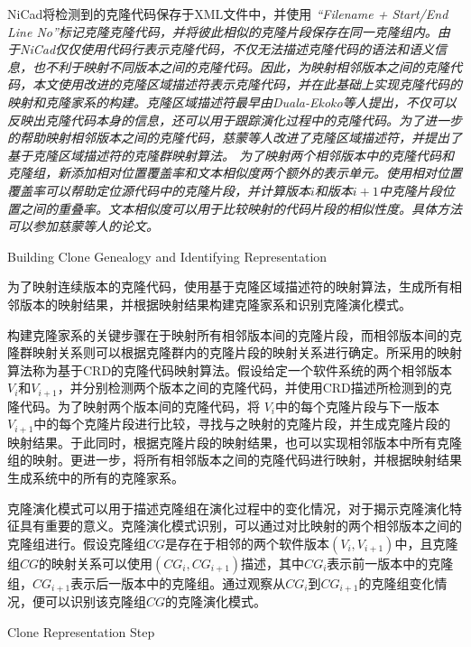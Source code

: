NiCad将检测到的克隆代码保存于XML文件中，并使用\em{ ``Filename + Start/End Line No''}标记克隆克隆代码，并将彼此相似的克隆片段保存在同一克隆组内。由于NiCad仅仅使用代码行表示克隆代码，不仅无法描述克隆代码的语法和语义信息，也不利于映射不同版本之间的克隆代码。因此，为映射相邻版本之间的克隆代码，本文使用改进的克隆区域描述符表示克隆代码，并在此基础上实现克隆代码的映射和克隆家系的构建。克隆区域描述符最早由Duala-Ekoko等人提出，不仅可以反映出克隆代码本身的信息，还可以用于跟踪演化过程中的克隆代码\cite{duala2010clone}。为了进一步的帮助映射相邻版本之间的克隆代码，慈蒙等人改进了克隆区域描述符，并提出了基于克隆区域描述符的克隆群映射算法\cite{ci2013new}\cite{ci2013newD}。
为了映射两个相邻版本中的克隆代码和克隆组，新添加相对位置覆盖率和文本相似度两个额外的表示单元。使用相对位置覆盖率可以帮助定位源代码中的克隆片段，并计算版本$ i $和版本$ i + 1 $中克隆片段位置之间的重叠率。文本相似度可以用于比较映射的代码片段的相似性度。具体方法可以参加慈蒙等人的论文\cite{ci2013newD}。

{Building Clone Genealogy and Identifying Representation}

为了映射连续版本的克隆代码，使用基于克隆区域描述符的映射算法，生成所有相邻版本的映射结果，并根据映射结果构建克隆家系和识别克隆演化模式。

构建克隆家系的关键步骤在于映射所有相邻版本间的克隆片段，而相邻版本间的克隆群映射关系则可以根据克隆群内的克隆片段的映射关系进行确定。所采用的映射算法称为基于CRD的克隆代码映射算法\cite{ci2013new}\cite{ci2013newD}。假设给定一个软件系统的两个相邻版本{$V_i$}和{$V_ {i + 1}$}，并分别检测两个版本之间的克隆代码，并使用CRD描述所检测到的克隆代码。为了映射两个版本间的克隆代码，将{ $V_i$}中的每个克隆片段与下一版本{$ V_{i+1}$}中的每个克隆片段进行比较，寻找与之映射的克隆片段，并生成克隆片段的映射结果。于此同时，根据克隆片段的映射结果，也可以实现相邻版本中所有克隆组的映射。更进一步，将所有相邻版本之间的克隆代码进行映射，并根据映射结果生成系统中的所有的克隆家系。

克隆演化模式可以用于描述克隆组在演化过程中的变化情况，对于揭示克隆演化特征具有重要的意义。克隆演化模式识别，可以通过对比映射的两个相邻版本之间的克隆组进行。假设克隆组$CG$是存在于相邻的两个软件版本{$(V_i,V_{i+1})$}中，且克隆组$CG$的映射关系可以使用{$(CG_i, CG_{i+1})$}描述，其中{$CG_i$}表示前一版本中的克隆组，{$CG_{i+1}$}表示后一版本中的克隆组。通过观察从{$CG_i$}到{$CG_{i+1}$}的克隆组变化情况，便可以识别该克隆组{$CG$}的克隆演化模式。

{Clone Representation Step}

